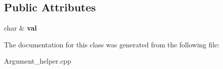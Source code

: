 \subsection*{Public Attributes}
\begin{DoxyCompactItemize}
\item 
\hypertarget{classdsr_1_1_argument__helper_1_1_char_target_af5c1784371ae17cb26c1a4ea12ff762b}{
char \& {\bfseries val}}
\label{classdsr_1_1_argument__helper_1_1_char_target_af5c1784371ae17cb26c1a4ea12ff762b}

\end{DoxyCompactItemize}


The documentation for this class was generated from the following file:\begin{DoxyCompactItemize}
\item 
Argument\_\-helper.cpp\end{DoxyCompactItemize}
